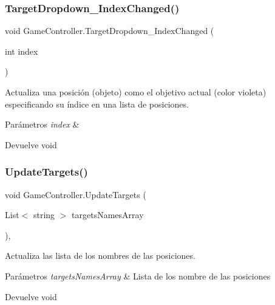 \subsubsection{\texorpdfstring{TargetDropdown\_IndexChanged()}{TargetDropdown\_IndexChanged()}}
{\footnotesize\ttfamily void Game\+Controller.\+Target\+Dropdown\+\_\+\+Index\+Changed (\begin{DoxyParamCaption}\item[{int}]{index }\end{DoxyParamCaption})\hspace{0.3cm}{\ttfamily [inline]}}

Actualiza una posición (objeto) como el objetivo actual (color violeta) especificando su índice en una lista de posiciones. 
\begin{DoxyParams}{Parámetros}
{\em index} & \\
\hline
\end{DoxyParams}
\begin{DoxyReturn}{Devuelve}
void 
\end{DoxyReturn}
\mbox{\label{class_game_controller_a0faec72a151b40bb1a13340f89a735aa}} 
\subsubsection{\texorpdfstring{UpdateTargets()}{UpdateTargets()}}
{\footnotesize\ttfamily void Game\+Controller.\+Update\+Targets (\begin{DoxyParamCaption}\item[{List$<$ string $>$}]{targets\+Names\+Array }\end{DoxyParamCaption})\hspace{0.3cm}{\ttfamily [inline]}, {\ttfamily [private]}}

Actualiza las lista de los nombres de las posiciones. 
\begin{DoxyParams}{Parámetros}
{\em targets\+Names\+Array} & Lista de los nombre de las posiciones \\
\hline
\end{DoxyParams}
\begin{DoxyReturn}{Devuelve}
void 
\end{DoxyReturn}
\mbox{\label{class_game_controller_a6f2e4f2c0b6a0e96d96087ad65c5b57c}} 
